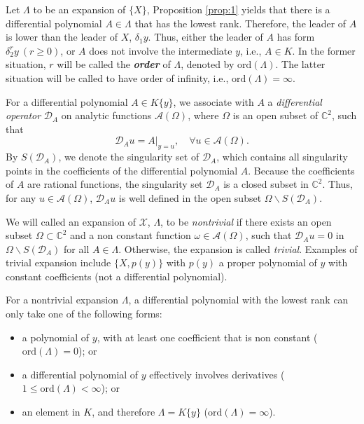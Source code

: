 \documentclass[preprint,12pt]{elsarticle}
\begin{document}
Let $\Lambda$ to be an expansion of $\{X\}$, Proposition \ref{prop:1} yields that there is a differential polynomial $A\in \Lambda$ that has the lowest rank. Therefore, the leader of $A$ is lower than the leader of $X$, $\delta_1y$. Thus, either the leader of $A$ has form $\delta_2^r y\ (r\geq 0)$,  or $A$ does not involve the intermediate $y$, i.e., $A\in K$.  In the former situation, $r$ will be called the \textbf{\textit{order}} of $\Lambda$,  denoted by $\mathrm{ord}(\Lambda)$.  The latter situation will be called to have order of infinity, i.e., $\mathrm{ord}(\Lambda)=\infty$. 

For a differential polynomial $A\in K\{y\}$, we associate with $A$ a \textit{differential operator} $\mathscr{D}_A$ on analytic functions $\mathcal{A}(\Omega)$, where $\Omega$ is an open subset of $\mathbb{C}^2$, such that
\begin{equation}
\label{eq:oa}
\mathscr{D}_Au = A|_{y=u},\quad \forall u\in \mathcal{A}(\Omega).
\end{equation}
By $S(\mathscr{D}_A)$, we denote the singularity set of $\mathscr{D}_A$, which contains all singularity points in the coefficients of the differential polynomial $A$. Because the coefficients of $A$ are rational functions, the singularity set $\mathscr{D}_A$ is a closed subset in $\mathbb{C}^2$.  Thus, for any $u\in \mathcal{A}(\Omega)$, $\mathscr{D}_A u$ is well defined in the open subset $\Omega\backslash S(\mathscr{D}_A)$.

We will called an expansion of $\mathscr{X}$, $\Lambda$, to be \textit{nontrivial} if there exists an open subset $\Omega\subset \mathbb{C}^2$ and a non constant function $\omega\in \mathcal{A}(\Omega)$, such that $\mathscr{D}_Au = 0$ in $\Omega\backslash S(\mathscr{D}_A)$ for all $A\in \Lambda$. Otherwise, the expansion is called \textit{trivial}.
Examples of trivial expansion include $\{X, p(y)\}$ with $p(y)$ a proper polynomial of $y$ with constant coefficients (not a differential polynomial).

For a nontrivial expansion $\Lambda$,  a differential polynomial with the lowest rank can only take one of the following forms:
\begin{itemize}
\item a polynomial of $y$, with at least one coefficient that is non constant ($\mathrm{ord}(\Lambda) = 0$); or
\item a differential polynomial of $y$ effectively involves derivatives ($1\leq \mathrm{ord}(\Lambda) < \infty$); or 
\item an element in $K$, and therefore $\Lambda = K\{y\}$ ($\mathrm{ord}(\Lambda) = \infty$).
\end{itemize}
\end{document}
